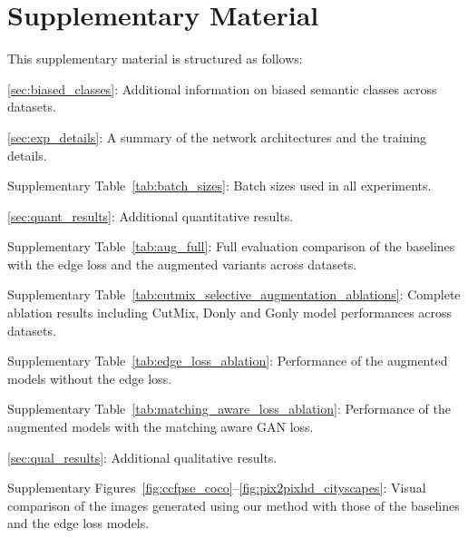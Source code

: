 \documentclass[final]{cvpr}
\newcommand\+{\mkern4mu}
\begin{document}
	\clearpage

	\setcounter{figure}{0}
	\setcounter{table}{0} 
	

	\appendix
	
	

\section*{Supplementary Material}
This supplementary material is structured as follows:
\begin{description}
	\item \ref{sec:biased_classes}: Additional information on biased semantic classes across datasets.
	\item \ref{sec:exp_details}: A summary of the network architectures and the training details.
	\begin{description}
		\item Supplementary Table~\ref{tab:batch_sizes}: Batch sizes used in all experiments.
	\end{description}
	\item \ref{sec:quant_results}: Additional quantitative results.
	\begin{description}
		\item Supplementary Table~\ref{tab:aug_full}: Full evaluation comparison of the baselines with the edge loss and the augmented variants across datasets.
		\item Supplementary Table~\ref{tab:cutmix_selective_augmentation_ablations}: Complete ablation results including CutMix, Donly and Gonly model performances across datasets.
		\item Supplementary Table~\ref{tab:edge_loss_ablation}: Performance of the augmented models without the edge loss.
		\item Supplementary Table~\ref{tab:matching_aware_loss_ablation}: Performance of the augmented models with the matching aware GAN loss.
	\end{description}
	\item \ref{sec:qual_results}: Additional qualitative results.
	\begin{description}
		\item Supplementary Figures~\ref{fig:ccfpse_coco}--\ref{fig:pix2pixhd_cityscapes}: Visual comparison of the images generated using our method with those of the baselines and the edge loss models. 
	\end{description}
\end{description}
\end{document}
